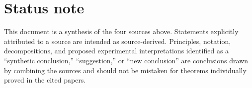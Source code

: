 \documentclass[11pt]{article}
\begin{document}
\section*{Status note}
This document is a synthesis of the four sources above. Statements explicitly attributed to a source are intended as source-derived. Principles, notation, decompositions, and proposed experimental interpretations identified as a ``synthetic conclusion,'' ``suggestion,'' or ``new conclusion'' are conclusions drawn by combining the sources and should not be mistaken for theorems individually proved in the cited papers.
\end{document}
